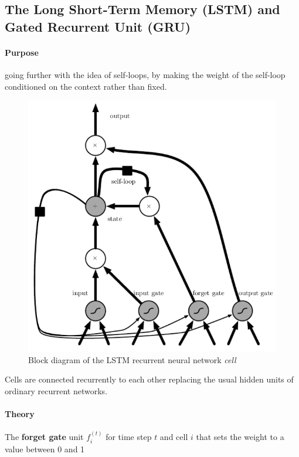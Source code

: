 \subsection{The Long Short-Term Memory (LSTM) and Gated Recurrent Unit (GRU)}
\paragraph{Purpose}
going further with the idea of self-loops, by making the weight of the self-loop
conditioned on the context rather than fixed.

\begin{figure}[H]
    \begin{center}
        \includegraphics[width=.5\textwidth]{chapters/4_deep_learning/3_types_of_neural_networks/images/04_lstm_rnn_cell.png}
    \end{center}
    \caption{Block diagram of the LSTM recurrent neural network \emph{cell}}
    \label{fig:label}
\end{figure}

Cells are connected recurrently to each other replacing the usual hidden units of
ordinary recurrent networks.

\paragraph{Theory}
The \textbf{forget gate} unit $f_{i}^{(t)}$ for time step $t$ and cell $i$ that sets
the weight to a value between 0 and 1
